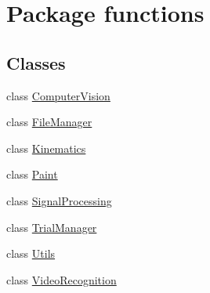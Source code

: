 \hypertarget{namespacefunctions}{}\section{Package functions}
\label{namespacefunctions}
\subsection*{Classes}
\begin{DoxyCompactItemize}
\item 
class \hyperlink{classfunctions_1_1_computer_vision}{Computer\+Vision}
\item 
class \hyperlink{classfunctions_1_1_file_manager}{File\+Manager}
\item 
class \hyperlink{classfunctions_1_1_kinematics}{Kinematics}
\item 
class \hyperlink{classfunctions_1_1_paint}{Paint}
\item 
class \hyperlink{classfunctions_1_1_signal_processing}{Signal\+Processing}
\item 
class \hyperlink{classfunctions_1_1_trial_manager}{Trial\+Manager}
\item 
class \hyperlink{classfunctions_1_1_utils}{Utils}
\item 
class \hyperlink{classfunctions_1_1_video_recognition}{Video\+Recognition}
\end{DoxyCompactItemize}

